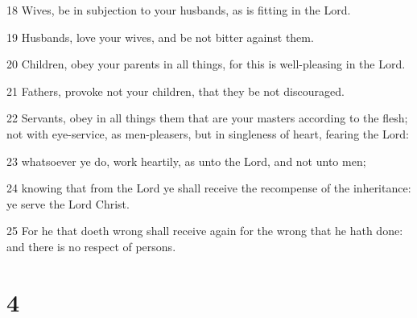 \par 18 Wives, be in subjection to your husbands, as is fitting in the Lord.
\par 19 Husbands, love your wives, and be not bitter against them.
\par 20 Children, obey your parents in all things, for this is well-pleasing in the Lord.
\par 21 Fathers, provoke not your children, that they be not discouraged.
\par 22 Servants, obey in all things them that are your masters according to the flesh; not with eye-service, as men-pleasers, but in singleness of heart, fearing the Lord:
\par 23 whatsoever ye do, work heartily, as unto the Lord, and not unto men;
\par 24 knowing that from the Lord ye shall receive the recompense of the inheritance: ye serve the Lord Christ.
\par 25 For he that doeth wrong shall receive again for the wrong that he hath done: and there is no respect of persons.

\chapter{4}

